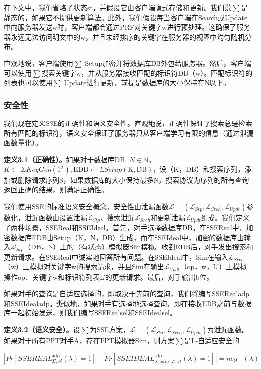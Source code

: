 \documentclass[UTF8]{article}
\begin{document}
在下文中，我们省略了状态st，并假设它由客户端隐式存储和更新。我们说$\sum$是静态的，如果它不提供更新算法。此外，我们假设每当客户端在Search或Update中向服务器发送w时，客户端都会通过PRF对关键字w进行预处理。这确保了服务器永远无法访问明文中的w，并且未经排序的关键字在服务器的视图中均匀随机分布。

直观地说，客户端使用$\sum$.Setup加密并将数据库DB外包给服务器。然后，客户端可以使用$\sum$搜索关键字w，并从服务器接收匹配的标识符DB（w）。匹配标识符的列表也可以使用$\sum$.Update进行更新，前提是数据库的大小保持在N以下。

\subsubsection{安全性}
我们现在定义SSE的正确性和语义安全性。直观地说，正确性保证了搜索总是检索所有匹配的标识符，语义安全保证了服务器只从客户端学习有限的信息（通过泄漏函数量化）。

\textbf{定义3.1（正确性）。}如果对于数据库DB, $N \in \mathbb{N}$，$K\leftarrow\Sigma {KeyGen}\left(1^{\lambda}\right), \mathrm{EDB} \leftarrow \Sigma {Setup}(\mathrm{K}, \mathrm{DB})$，设（K，DB）和搜索序列，添加或删除请求序列S，如果数据库的大小保持最多N，搜索协议为序列的所有查询返回正确的结果，则满足正确性。

我们使用SSE的标准语义安全概念。安全性由泄漏函数$\mathcal{L}=\left(\mathcal{L}_{{Stp }}, \mathcal{L}_{{Srch }}, \mathcal{L}_{{Updt }}\right)$参数化，泄漏函数由设置泄漏$\mathcal{L}_{{Stp }}$、搜索泄漏$\mathcal{L}_{{Srch }}$和更新泄漏$\mathcal{L}_{{Updt }}$组成。我们定义了两种场景，SSEReal和SSEIdeal。首先，对手选择数据库DB。在SSEReal中，加密数据库EDB由Setup（K，N，DB）生成，而在SSEIdeal中，加密的数据库由输入$\mathcal{L}_{{Stp }}$（DB，N）上的（有状态）模拟器Sim模拟。收到EDB后，对手发出搜索和更新请求。在SSEReal中诚实地回答所有问题。在SSEIdeal中，Sim在输入$\mathcal{L}_{{Srch }}$（w）上模拟对关键字w的搜索请求，并且Sim在输出$\mathcal{L}_{{Updt }}$（op，w，L′）上模拟操作op、关键字w和标识符列表L′的更新请求。最后，对手输出b位。

如果对手的查询是自适应选择的，即取决于先前的查询，我们将编写SSERealadp和SSEIdealadp。类似地，如果对手有选择地选择查询，即在接收EDB之前与数据库一起初始发送，则我们编写SSERealsel和SSEIdealsel。

\textbf{定义3.2（语义安全）。}设$\sum$为SSE方案，$\mathcal{L}=\left(\mathcal{L}_{{Stp }}, \mathcal{L}_{{Srch }}, \mathcal{L}_{{Updt }}\right)$为泄漏函数。如果对于所有PPT对手A，存在PPT模拟器Sim，则方案$\sum$是L-自适应安全的

$\left|{Pr}\left[{SSEREAL}_{\Sigma, \mathcal{A}}^{\mathrm{adp}}(\lambda)=1\right]-{Pr}\left[{SSEIDEAL}_{\Sigma, {Sim}, \mathcal{L}, \mathcal{A}}^{\mathrm{adp}}(\lambda)=1\right]\right|={neg} \mid(\lambda)$
\end{document}
